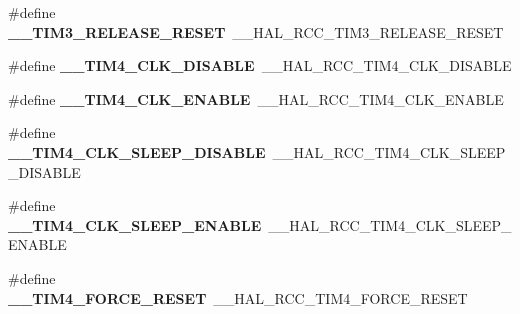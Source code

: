 \begin{DoxyCompactItemize}
\item 
\hypertarget{group___h_a_l___r_c_c___aliased_ga8b8192c731e744d5018630a86deb118b}{\#define {\bfseries \-\_\-\-\_\-\-T\-I\-M3\-\_\-\-R\-E\-L\-E\-A\-S\-E\-\_\-\-R\-E\-S\-E\-T}~\-\_\-\-\_\-\-H\-A\-L\-\_\-\-R\-C\-C\-\_\-\-T\-I\-M3\-\_\-\-R\-E\-L\-E\-A\-S\-E\-\_\-\-R\-E\-S\-E\-T}\label{group___h_a_l___r_c_c___aliased_ga8b8192c731e744d5018630a86deb118b}

\item 
\hypertarget{group___h_a_l___r_c_c___aliased_ga489be82d36ad4def594b8ae60320f3c6}{\#define {\bfseries \-\_\-\-\_\-\-T\-I\-M4\-\_\-\-C\-L\-K\-\_\-\-D\-I\-S\-A\-B\-L\-E}~\-\_\-\-\_\-\-H\-A\-L\-\_\-\-R\-C\-C\-\_\-\-T\-I\-M4\-\_\-\-C\-L\-K\-\_\-\-D\-I\-S\-A\-B\-L\-E}\label{group___h_a_l___r_c_c___aliased_ga489be82d36ad4def594b8ae60320f3c6}

\item 
\hypertarget{group___h_a_l___r_c_c___aliased_gaa07342539b69e7fc53a934d91f6915e2}{\#define {\bfseries \-\_\-\-\_\-\-T\-I\-M4\-\_\-\-C\-L\-K\-\_\-\-E\-N\-A\-B\-L\-E}~\-\_\-\-\_\-\-H\-A\-L\-\_\-\-R\-C\-C\-\_\-\-T\-I\-M4\-\_\-\-C\-L\-K\-\_\-\-E\-N\-A\-B\-L\-E}\label{group___h_a_l___r_c_c___aliased_gaa07342539b69e7fc53a934d91f6915e2}

\item 
\hypertarget{group___h_a_l___r_c_c___aliased_gac785e48843cc0930737a7865794d502e}{\#define {\bfseries \-\_\-\-\_\-\-T\-I\-M4\-\_\-\-C\-L\-K\-\_\-\-S\-L\-E\-E\-P\-\_\-\-D\-I\-S\-A\-B\-L\-E}~\-\_\-\-\_\-\-H\-A\-L\-\_\-\-R\-C\-C\-\_\-\-T\-I\-M4\-\_\-\-C\-L\-K\-\_\-\-S\-L\-E\-E\-P\-\_\-\-D\-I\-S\-A\-B\-L\-E}\label{group___h_a_l___r_c_c___aliased_gac785e48843cc0930737a7865794d502e}

\item 
\hypertarget{group___h_a_l___r_c_c___aliased_ga4800dcd32761c733ad412cb7480f7f5a}{\#define {\bfseries \-\_\-\-\_\-\-T\-I\-M4\-\_\-\-C\-L\-K\-\_\-\-S\-L\-E\-E\-P\-\_\-\-E\-N\-A\-B\-L\-E}~\-\_\-\-\_\-\-H\-A\-L\-\_\-\-R\-C\-C\-\_\-\-T\-I\-M4\-\_\-\-C\-L\-K\-\_\-\-S\-L\-E\-E\-P\-\_\-\-E\-N\-A\-B\-L\-E}\label{group___h_a_l___r_c_c___aliased_ga4800dcd32761c733ad412cb7480f7f5a}

\item 
\hypertarget{group___h_a_l___r_c_c___aliased_gab4e910ec77744c42b35ba6fe5e5b902b}{\#define {\bfseries \-\_\-\-\_\-\-T\-I\-M4\-\_\-\-F\-O\-R\-C\-E\-\_\-\-R\-E\-S\-E\-T}~\-\_\-\-\_\-\-H\-A\-L\-\_\-\-R\-C\-C\-\_\-\-T\-I\-M4\-\_\-\-F\-O\-R\-C\-E\-\_\-\-R\-E\-S\-E\-T}\label{group___h_a_l___r_c_c___aliased_gab4e910ec77744c42b35ba6fe5e5b902b}


\end{DoxyCompactItemize}
